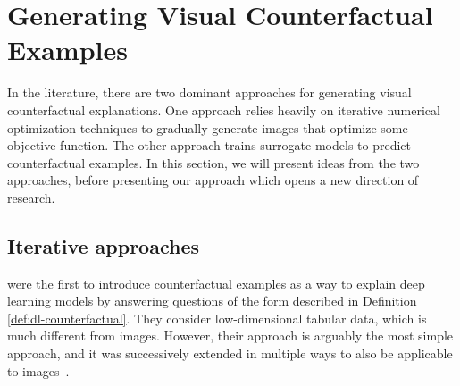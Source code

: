 \documentclass[11pt,a4paper,twoside,openright,final]{memoir}
\begin{document}
\section{Generating Visual Counterfactual Examples}
In the literature, there are two dominant approaches for generating visual counterfactual explanations.
One approach relies heavily on iterative numerical optimization techniques to gradually generate images that optimize some objective function.
The other approach trains surrogate models to predict counterfactual examples. 
In this section, we will present ideas from the two approaches, before presenting our approach which opens a new direction of research. 

\subsection{Iterative approaches}
\citet{Wachter2017} were the first to introduce counterfactual examples as a way to explain deep learning models by answering questions of the form described in Definition \ref{def:dl-counterfactual}. 
They consider low-dimensional tabular data, which is much different from images.
However, their approach is arguably the most simple approach, and it was successively extended in multiple ways to also be applicable to images~\cite{Dhurandhar2018, VanLooveren2019}. 
\end{document}
